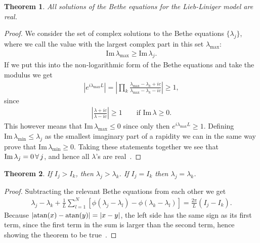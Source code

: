 \documentclass[11pt, a4paper]{report} %
\newtheorem{theorem}{Theorem}
\begin{document}
\begin{theorem}
All solutions of the Bethe equations for the Lieb-Liniger model are real.
\end{theorem}

\begin{proof}
We consider the set of complex solutions to the Bethe equations \(\{\lambda_j\}\), where we call the value with the largest complex part in this set \(\lambda_{\max}\):
\begin{align}
\textrm{Im} \, \lambda_{\max} \geq \textrm{Im} \, \lambda_j.
\end{align}
If we put this into the non-logarithmic form of the Bethe equations and take the modulus we get
\begin{align}
  \left| e^{i\lambda_{\max} L} \right|= \left| \prod_k \frac{\lambda_{\max} - \lambda_k + ic}{\lambda_{\max} - \lambda_k - ic} \right|\geq 1,
\end{align}
since
\begin{align}
\left|\frac{\lambda+ic}{\lambda-ic} \right| \geq 1 \qquad \textrm{if Im}\, \lambda \geq 0.
\end{align}
This however means that \(\textrm{Im}\, \lambda_{\max} \leq 0\) since only then \(e^{i\lambda_{\max}L} \geq 1\).
Defining \(\textrm{Im}\,\lambda_{\min}\leq \lambda_j\) as the smallest imaginary part of a rapidity we can in the same way prove that \(\textrm{Im}\,\lambda_{\min} \geq 0\).
Taking these statements together we see that \(\textrm{Im}\, \lambda_{j}=0\textrm{\,}\forall\textrm{\,} j\), and hence all  \(\lambda\)'s are real~\cite{Korepin1993}.
\end{proof}

\begin{theorem}\label{th:equalisequal}
If \(I_j >I_k\), then \(\lambda_j > \lambda_k\). If \(I_j=I_k\) then \(\lambda_j=\lambda_k\).
\end{theorem}

\begin{proof}
Subtracting the relevant Bethe equations from each other we get
\begin{align}
  \lambda_j - \lambda_k + \frac{1}{L}\sum_{l=1}^N \left[\phi(\lambda_j - \lambda_l) - \phi(\lambda_k - \lambda_l)\right] = \frac{2\pi}{L} (I_j - I_k).
\end{align}
Because \(\abs{\atan(x)-\atan(y)}=\abs{x-y}\), the left side has the same sign as its first term, since the first term in the sum is larger than the second term, hence showing the theorem to be true~\cite{Korepin1993,Gaudin2009}.
\end{proof}
\end{document}
